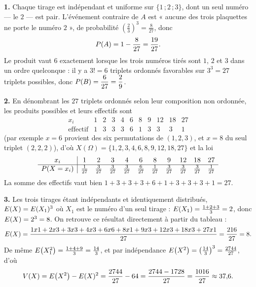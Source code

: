 \begin{corrige}
\textbf{1.} Chaque tirage est indépendant et uniforme sur $\{1\,;2\,;3\}$,
dont un seul numéro — le $2$ — est pair. L'événement contraire de $A$ est
« aucune des trois plaquettes ne porte le numéro $2$ », de probabilité
$\left(\frac23\right)^{3} = \frac{8}{27}$, donc
\[
  P\!\left(A\right) = 1-\frac{8}{27} = \frac{19}{27}.
\]
Le produit vaut $6$ exactement lorsque les trois numéros tirés sont $1$, $2$
et $3$ dans un ordre quelconque : il y a $3! = 6$ triplets ordonnés
favorables sur $3^{3} = 27$ triplets possibles, donc
$P\!\left(B\right) = \dfrac{6}{27} = \dfrac{2}{9}$.

\textbf{2.} En dénombrant les $27$ triplets ordonnés selon leur composition
non ordonnée, les produits possibles et leurs effectifs sont
\[
  \begin{array}{c|cccccccccc}
    x_{i} & 1 & 2 & 3 & 4 & 6 & 8 & 9 & 12 & 18 & 27 \\
    \hline
    \text{effectif} & 1 & 3 & 3 & 3 & 6 & 1 & 3 & 3 & 3 & 1
  \end{array}
\]
(par exemple $x = 6$ provient des six permutations de $(1,2,3)$, et
$x = 8$ du seul triplet $(2,2,2)$), d'où $X(\Omega)
= \{1,2,3,4,6,8,9,12,18,27\}$ et la loi
\[
  \begin{array}{c|cccccccccc}
    x_{i} & 1 & 2 & 3 & 4 & 6 & 8 & 9 & 12 & 18 & 27 \\
    \hline
    P\!\left(X = x_{i}\right) & \frac{1}{27} & \frac{3}{27} & \frac{3}{27} &
    \frac{3}{27} & \frac{6}{27} & \frac{1}{27} & \frac{3}{27} &
    \frac{3}{27} & \frac{3}{27} & \frac{1}{27}
  \end{array}
\]
La somme des effectifs vaut bien $1+3+3+3+6+1+3+3+3+1 = 27$.

\textbf{3.} Les trois tirages étant indépendants et identiquement
distribués, $E(X) = E(X_{1})^{3}$ où $X_{1}$ est le numéro d'un seul
tirage : $E(X_{1}) = \frac{1+2+3}{3} = 2$, donc $E(X) = 2^{3} = 8$. On
retrouve ce résultat directement à partir du tableau :
\[
  E(X) = \frac{1 x1+2x3+3x3+4x3+6x6+8x1
  +9x3+12x3+18x3+27x1}{27} = \frac{216}{27} = 8 .
\]
De même $E\!\left(X_{1}^{2}\right) = \frac{1+4+9}{3} = \frac{14}{3}$, et
par indépendance
$E\!\left(X^{2}\right) = \left(\frac{14}{3}\right)^{3}
= \frac{2744}{27}$, d'où
\[
  V(X) = E\!\left(X^{2}\right)-E(X)^{2}
  = \frac{2744}{27}-64 = \frac{2744-1728}{27} = \frac{1016}{27}
  \approx 37{,}6 .
\]


\end{corrige}
